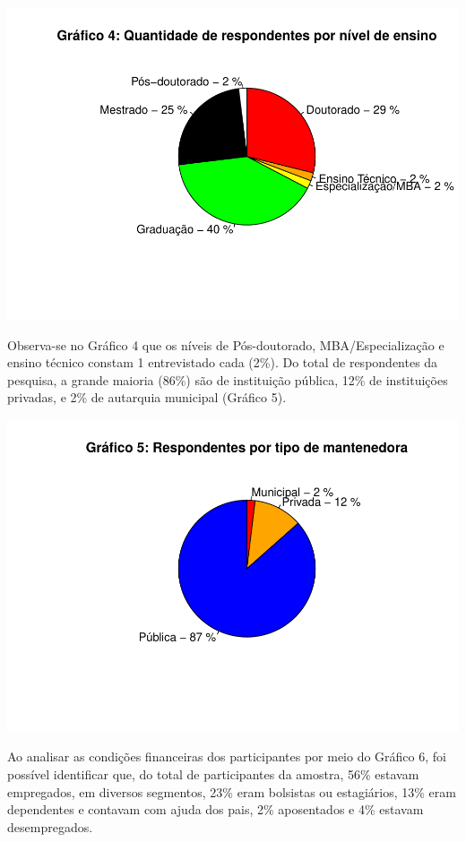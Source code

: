 \documentclass[
]{article}
\begin{document}
\includegraphics{consequencias-oriundas-da-pandemia-v1.0_files/figure-latex/grafico-4-1.pdf}

Observa-se no Gráfico 4 que os níveis de Pós-doutorado,
MBA/Especialização e ensino técnico constam 1 entrevistado cada (2\%).
Do total de respondentes da pesquisa, a grande maioria (86\%) são de
instituição pública, 12\% de instituições privadas, e 2\% de autarquia
municipal (Gráfico 5).

\includegraphics{consequencias-oriundas-da-pandemia-v1.0_files/figure-latex/grafico-5-1.pdf}

Ao analisar as condições financeiras dos participantes por meio do
Gráfico 6, foi possível identificar que, do total de participantes da
amostra, 56\% estavam empregados, em diversos segmentos, 23\% eram
bolsistas ou estagiários, 13\% eram dependentes e contavam com ajuda dos
pais, 2\% aposentados e 4\% estavam desempregados.
\end{document}
